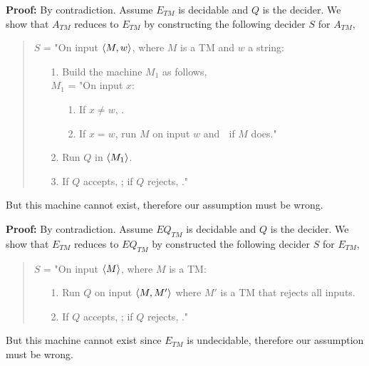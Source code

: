 \documentclass[a4paper,blends,pdf,colorBG,slideColor]{prosper}
\begin{document}
{\bf Proof:} By contradiction.  Assume $E_{TM}$ is decidable and $Q$ is the decider.
We show that $A_{TM}$ reduces to $E_{TM}$ by constructing the following
decider $S$ for $A_{TM}$,
\begin{quote}
$S$ = "On input $\langle {M,w} \rangle$, where $M$ is a TM and $w$ a string:
\begin{enumerate}
\item[1.] Build the machine $M_1$ as follows,\\
$M_1$ = "On input $x$:
\begin{enumerate}
\item[1.] If $x \ne w$, \reject.
\item[2.] If $x = w$, run $M$ on input $w$ and \accept $\;$ if $M$ does."
\end{enumerate}
\item[2.] Run $Q$ in $\langle {M_1} \rangle$.
\item[3.] If $Q$ accepts, \reject; if $Q$ rejects, \accept."
\end{enumerate}
\end{quote}

But this machine cannot exist, therefore our assumption must be wrong.
\es




{\bf Proof:} By contradiction.  Assume $EQ_{TM}$ is decidable and $Q$ is the decider.
We show that $E_{TM}$ reduces to $EQ_{TM}$ by constructed the following
decider $S$ for $E_{TM}$,
\begin{quote}
$S$ = "On input $\langle {M} \rangle$, where $M$ is a TM:
\begin{enumerate}
\item[1.] Run $Q$ on input $\langle {M,M'} \rangle$ where  $M'$ is a TM that rejects
all inputs.
\item[2.] If $Q$ accepts, \accept; if $Q$ rejects, \reject."
\end{enumerate}
\end{quote}
But this machine cannot exist since $E_{TM}$ is undecidable, therefore our assumption must be wrong.

\es
\end{document}
